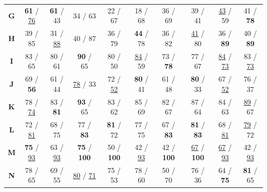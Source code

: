 \documentclass{llmxive}
\providecommand{\tasktypepair}[2]{#1 / #2}
\begin{document}
{\begin{table}[tb]
{\begin{tabular}{c|ccccccccc}
\textbf{G} & \tasktypepair{\textbf{61}}{\underline{76}} & \tasktypepair{\textbf{61}}{43} & \tasktypepair{34}{63} & \tasktypepair{22}{67} & \tasktypepair{18}{68} & \tasktypepair{36}{69} & \tasktypepair{39}{41} & \tasktypepair{\underline{43}}{59} & \tasktypepair{41}{\textbf{78}} \\
\textbf{H} & \tasktypepair{39}{85} & \tasktypepair{31}{\underline{88}} & \tasktypepair{40}{87} & \tasktypepair{36}{79} & \tasktypepair{\textbf{44}}{78} & \tasktypepair{36}{82} & \tasktypepair{\underline{41}}{80} & \tasktypepair{36}{\textbf{89}} & \tasktypepair{40}{\textbf{89}} \\
\textbf{I} & \tasktypepair{83}{65} & \tasktypepair{80}{61} & \tasktypepair{\textbf{90}}{65} & \tasktypepair{80}{50} & \tasktypepair{\underline{84}}{59} & \tasktypepair{73}{\textbf{78}} & \tasktypepair{77}{67} & \tasktypepair{\underline{84}}{\underline{73}} & \tasktypepair{83}{\underline{73}} \\
\textbf{J} & \tasktypepair{69}{\textbf{56}} & \tasktypepair{61}{44} & \tasktypepair{\underline{78}}{33} & \tasktypepair{72}{\underline{52}} & \tasktypepair{\textbf{80}}{41} & \tasktypepair{61}{48} & \tasktypepair{\textbf{80}}{33} & \tasktypepair{67}{\underline{52}} & \tasktypepair{76}{37} \\
\textbf{K} & \tasktypepair{78}{\underline{74}} & \tasktypepair{83}{\textbf{81}} & \tasktypepair{\textbf{93}}{65} & \tasktypepair{83}{62} & \tasktypepair{85}{69} & \tasktypepair{82}{67} & \tasktypepair{87}{64} & \tasktypepair{84}{63} & \tasktypepair{\underline{89}}{67} \\
\textbf{L} & \tasktypepair{72}{\underline{81}} & \tasktypepair{68}{75} & \tasktypepair{77}{\textbf{83}} & \tasktypepair{\textbf{81}}{72} & \tasktypepair{77}{75} & \tasktypepair{67}{\textbf{83}} & \tasktypepair{\textbf{81}}{\textbf{83}} & \tasktypepair{68}{\underline{81}} & \tasktypepair{\underline{79}}{72} \\
\textbf{M} & \tasktypepair{\textbf{75}}{\underline{93}} & \tasktypepair{63}{\underline{93}} & \tasktypepair{\textbf{75}}{\textbf{100}} & \tasktypepair{50}{\textbf{100}} & \tasktypepair{42}{\underline{93}} & \tasktypepair{42}{\textbf{100}} & \tasktypepair{\underline{67}}{\textbf{100}} & \tasktypepair{\underline{67}}{\underline{93}} & \tasktypepair{42}{\underline{93}} \\
\textbf{N} & \tasktypepair{78}{65} & \tasktypepair{69}{55} & \tasktypepair{\underline{80}}{\underline{71}} & \tasktypepair{75}{53} & \tasktypepair{78}{60} & \tasktypepair{50}{70} & \tasktypepair{76}{36} & \tasktypepair{64}{\textbf{75}} & \tasktypepair{\textbf{81}}{65} \\

\end{tabular}}
\end{table}}
\end{document}
